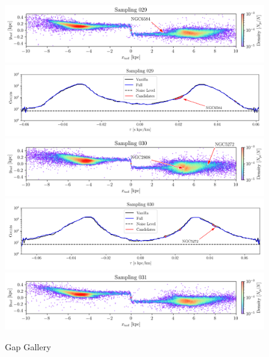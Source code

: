 \documentclass{aa}
\begin{document}
\begin{appendix}
    \begin{figure}
      \centering      
      \includegraphics[width=\linewidth]{gallery_of_gaps_monte-carlo-029.png}    
      \includegraphics[width=\linewidth]{tau-profile-monte-carlo-029.png}  
      \includegraphics[width=\linewidth]{gallery_of_gaps_monte-carlo-030.png}
      \includegraphics[width=\linewidth]{tau-profile-monte-carlo-030.png}
      \includegraphics[width=\linewidth]{gallery_of_gaps_monte-carlo-031.png}
      \caption{Gap Gallery}
      \label{fig:gallery7}
      \end{figure}        



\end{appendix}
\end{document}
